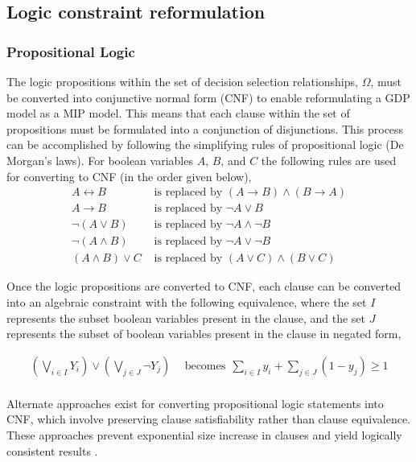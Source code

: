 \documentclass{juliacon}
\begin{document}
\subsection{Logic constraint reformulation}

\subsubsection{Propositional Logic}
The logic propositions within the set of decision selection relationships, $\Omega$, must be converted into conjunctive normal form (CNF) to enable reformulating a GDP model as a MIP model. This means that each clause within the set of propositions must be formulated into a conjunction of disjunctions. This process can be accomplished by following the simplifying rules of propositional logic (De Morgan's laws). For boolean variables $A$, $B$, and $C$ the following rules are used for converting to CNF (in the order given below),
\begin{align*}
    A \leftrightarrow B & \text{ is replaced by } (A \rightarrow B) \land (B \rightarrow A) \\
    A \rightarrow B & \text{ is replaced by } \lnot A \lor B \\
    \lnot(A \lor B) & \text{ is replaced by } \lnot A \land \lnot B \\
    \lnot(A \land B) & \text{ is replaced by } \lnot A \lor \lnot B \\
    (A \land B) \lor C & \text{ is replaced by } (A \lor C) \land (B \lor C)
\end{align*}

Once the logic propositions are converted to CNF, each clause can be converted into an algebraic constraint with the following equivalence, where the set $I$ represents the subset boolean variables present in the clause, and the set $J$ represents the subset of boolean variables present in the clause in negated form,

\begin{align*}
    \left(\bigvee_{i \in I} Y_i\right) \vee \left(\bigvee_{j \in J} \neg Y_j\right) & \ \ \text{becomes} \ \ \sum_{i \in I} y_i + \sum_{j \in J} (1-y_j) \geq 1 \\
\end{align*}

Alternate approaches exist for converting propositional logic statements into CNF, which involve preserving clause satisfiability rather than clause equivalence. These approaches prevent exponential size increase in clauses and yield logically consistent results \cite{jackson_sheridan_2005}.
\end{document}
